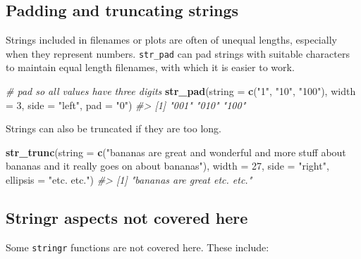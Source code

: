 \documentclass[]{book}
\newenvironment{Shaded}{}{}
\newcommand{\CommentTok}[1]{\textcolor[rgb]{0.38,0.63,0.69}{\textit{#1}}}
\newcommand{\DataTypeTok}[1]{\textcolor[rgb]{0.56,0.13,0.00}{#1}}
\newcommand{\DecValTok}[1]{\textcolor[rgb]{0.25,0.63,0.44}{#1}}
\newcommand{\KeywordTok}[1]{\textcolor[rgb]{0.00,0.44,0.13}{\textbf{#1}}}
\newcommand{\NormalTok}[1]{#1}
\newcommand{\StringTok}[1]{\textcolor[rgb]{0.25,0.44,0.63}{#1}}
\begin{document}
\hypertarget{padding-and-truncating-strings}{%
\subsection{Padding and truncating strings}\label{padding-and-truncating-strings}}

Strings included in filenames or plots are often of unequal lengths, especially when they represent numbers. \texttt{str\_pad} can pad strings with suitable characters to maintain equal length filenames, with which it is easier to work.

\begin{Shaded}
\begin{Highlighting}[]
\CommentTok{# pad so all values have three digits}
\KeywordTok{str_pad}\NormalTok{(}\DataTypeTok{string =} \KeywordTok{c}\NormalTok{(}\StringTok{"1"}\NormalTok{, }\StringTok{"10"}\NormalTok{, }\StringTok{"100"}\NormalTok{),}
        \DataTypeTok{width =} \DecValTok{3}\NormalTok{,}
        \DataTypeTok{side =} \StringTok{"left"}\NormalTok{,}
        \DataTypeTok{pad =} \StringTok{"0"}\NormalTok{)}
\CommentTok{#> [1] "001" "010" "100"}
\end{Highlighting}
\end{Shaded}

Strings can also be truncated if they are too long.

\begin{Shaded}
\begin{Highlighting}[]
\KeywordTok{str_trunc}\NormalTok{(}\DataTypeTok{string =} \KeywordTok{c}\NormalTok{(}\StringTok{"bananas are great and wonderful}
\StringTok{                     and more stuff about bananas and}
\StringTok{                     it really goes on about bananas"}\NormalTok{),}
          \DataTypeTok{width =} \DecValTok{27}\NormalTok{,}
          \DataTypeTok{side =} \StringTok{"right"}\NormalTok{, }\DataTypeTok{ellipsis =} \StringTok{"etc. etc."}\NormalTok{)}
\CommentTok{#> [1] "bananas are great etc. etc."}
\end{Highlighting}
\end{Shaded}

\hypertarget{stringr-aspects-not-covered-here}{%
\subsection{Stringr aspects not covered here}\label{stringr-aspects-not-covered-here}}

Some \texttt{stringr} functions are not covered here. These include:
\end{document}
